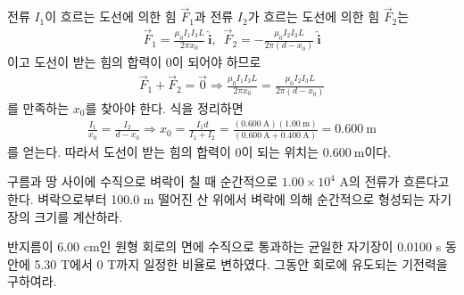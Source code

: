 \documentclass[tightenlines,floatfix,nofootinbib,superscriptaddress,fleqn]{revtex4}
\begin{document}
전류 $I_1$이 흐르는 도선에 의한 힘 $\vec{F}_1$과 전류 $I_2$가 흐르는 도선에 의한 힘 
$\vec{F}_2$는
\begin{align}
  \vec{F}_1 = \frac{\mu_0I_1 I_3 L}{2\pi x_0}~\hat{\bm i},\,\,\,
  \vec{F}_2 =-\frac{\mu_0I_2 I_3 L}{2\pi (d-x_0)}~\hat{\bm i}
\end{align}
이고 도선이 받는 힘의 합력이 0이 되어야 하므로
\begin{align}
  \vec{F}_1+\vec{F}_2=\vec{0} \Longrightarrow
  \frac{\mu_0I_1 I_3 L}{2\pi x_0}=\frac{\mu_0I_2 I_3 L}{2\pi (d-x_0)}
\end{align}
를 만족하는 $x_0$를 찾아야 한다. 식을 정리하면
\begin{align}
  \frac{I_1}{x_0}=\frac{I_2}{d-x_0}\Longrightarrow
  x_0 = \frac{I_1d}{I_1+I_2} = \frac{(0.600~\mathrm{A})(1.00~\mathrm{m})}
  {(0.600~\mathrm{A}+0.400~\mathrm{A})}=0.600~\mathrm{m}
\end{align}
를 얻는다. 따라서 도선이 받는 힘의 합력이 0이 되는 위치는 $0.600~\mathrm{m}$이다.
\vspace{1cm}

구름과 땅 사이에 수직으로 벼락이 칠 때 순간적으로 $1.00\times 10^4$
A의 전류가 흐른다고 한다. 벼락으로부터 100.0 m 떨어진 산 위에서 벼락에
의해 순간적으로 형성되는 자기장의 크기를 계산하라.


\vspace{1cm}

반지름이 6.00 cm인 원형 회로의 면에 수직으로 통과하는 균일한 자기장이
0.0100 s 동안에 5.30 T에서 0 T까지 일정한 비율로 변하였다. 그동안
회로에 유도되는 기전력을 구하여라.

\vspace{1cm}
\end{document}
